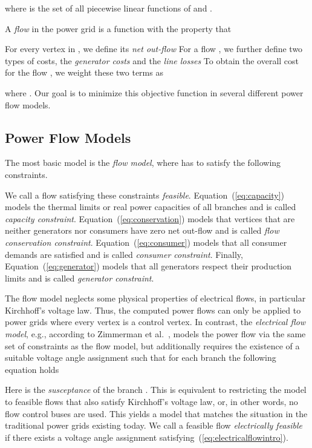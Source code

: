 \documentclass{article}[11pt,a4paper]
\begin{document}
where  is the set of all piecewise linear functions of  and .


A \emph{flow}  in the power grid  is a function  with the property that 

For every vertex  in , we define its \emph{net
  out-flow}  
For a flow , we further define two types of costs, the \emph{generator
  costs}  and the
\emph{line losses}  To
obtain the overall cost for the flow , we weight these two terms as

where .  Our goal is to minimize this objective
function in several different power flow models.
\subsection{Power Flow Models}
\label{sec:power-flow-models}
The most basic model is the \emph{flow model}, where  has to
satisfy the following constraints.

We call a flow satisfying these constraints \emph{feasible}.
Equation~(\ref{eq:capacity}) models the thermal limits or real power capacities of all branches and is called \emph{capacity constraint}. 
Equation~(\ref{eq:conservation}) models that vertices that are neither generators nor consumers have zero net out-flow and is called \emph{flow conservation constraint}. 
Equation~(\ref{eq:consumer}) models that all consumer demands are satisfied and is called \emph{consumer constraint}.
Finally, Equation~(\ref{eq:generator}) models that all generators respect their production limits and is called \emph{generator constraint}.


The flow model neglects some physical properties of electrical flows,
in particular Kirchhoff's voltage law.  Thus, the computed power
flows can only be applied to power grids where every vertex is
a control vertex.  In contrast, the \emph{electrical flow
  model}, e.g., according to Zimmerman et al.~\cite{Zimmerman2011a}, models the
power flow via the same set of constraints as the flow model, but additionally requires
the existence of a suitable voltage angle assignment  such that for each branch  the following equation
holds 

Here  is the \emph{susceptance} of the branch .  This is
equivalent to restricting the model to feasible flows that also satisfy
Kirchhoff's voltage law, or, in other words, no flow control buses are used.
This yields a model that matches the situation in the traditional power grids existing today.
We call a feasible flow  \emph{electrically feasible} if
there exists a voltage angle assignment 
satisfying~(\ref{eq:electricalflowintro}).
\end{document}
